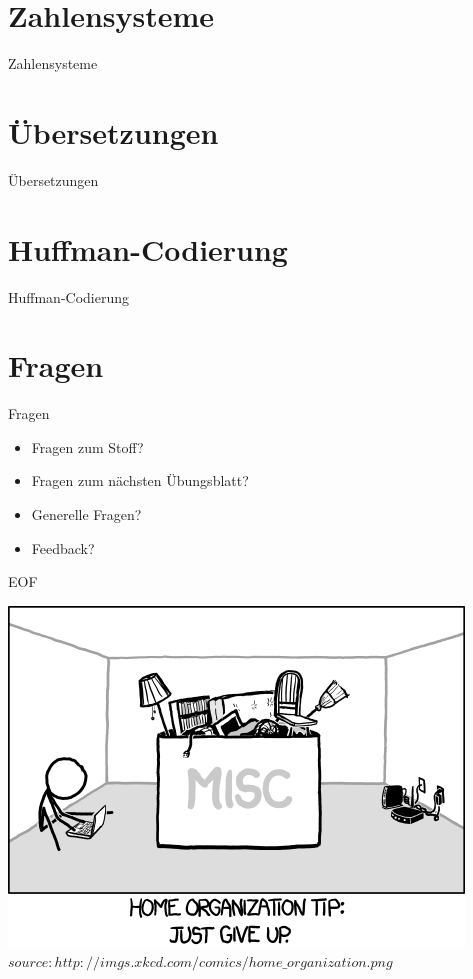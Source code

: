 	
	\section{Zahlensysteme}
	\begin{frame}{Zahlensysteme}
	
	\end{frame}
	
	
	
	\section{Übersetzungen}
	\begin{frame}{Übersetzungen}
	
	\end{frame}
	
	
	
	
	\section{Huffman-Codierung}
	\begin{frame}{Huffman-Codierung}
	
	\end{frame}		
	
	
	
	
	\section{Fragen}
	\begin{frame} {Fragen}
		\begin{itemize}
			\item Fragen zum Stoff?
			\item Fragen zum n\"achsten \"Ubungsblatt?
			\item Generelle Fragen?
			\item Feedback?
		\end{itemize}
	\end{frame}

		
	\begin{frame} {EOF}
		\begin{center}
			\includegraphics[scale=0.5]{graphics/eof5.png}\\
			\tiny $source: http://imgs.xkcd.com/comics/home\_organization.png$
		\end{center}
	\end{frame}



